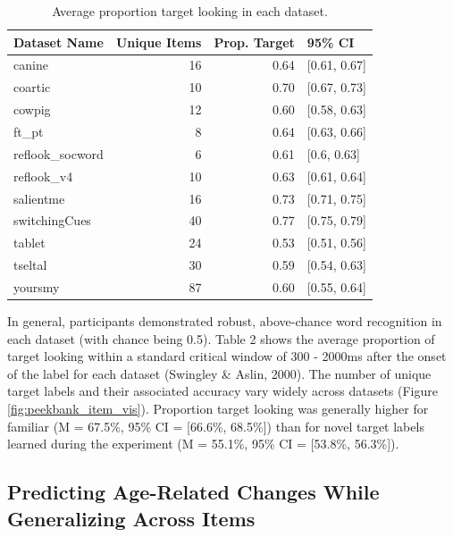 \documentclass[10pt, letterpaper]{article}
\begin{document}
\begin{table}[H]
\centering
\begingroup\fontsize{9pt}{10pt}\selectfont
\begin{tabular}{lrrl}
  \hline
Dataset Name & Unique Items & Prop. Target & 95\% CI \\ 
  \hline
canine & 16 & 0.64 & [0.61, 0.67] \\ 
  coartic & 10 & 0.70 & [0.67, 0.73] \\ 
  cowpig & 12 & 0.60 & [0.58, 0.63] \\ 
  ft\_pt & 8 & 0.64 & [0.63, 0.66] \\ 
  reflook\_socword & 6 & 0.61 & [0.6, 0.63] \\ 
  reflook\_v4 & 10 & 0.63 & [0.61, 0.64] \\ 
  salientme & 16 & 0.73 & [0.71, 0.75] \\ 
  switchingCues & 40 & 0.77 & [0.75, 0.79] \\ 
  tablet & 24 & 0.53 & [0.51, 0.56] \\ 
  tseltal & 30 & 0.59 & [0.54, 0.63] \\ 
  yoursmy & 87 & 0.60 & [0.55, 0.64] \\ 
   \hline
\end{tabular}
\endgroup
\caption{Average proportion target looking in each dataset.} 
\end{table}

In general, participants demonstrated robust, above-chance word
recognition in each dataset (with chance being 0.5). Table 2 shows the
average proportion of target looking within a standard critical window
of 300 - 2000ms after the onset of the label for each dataset (Swingley
\& Aslin, 2000). The number of unique target labels and their associated
accuracy vary widely across datasets (Figure
\ref{fig:peekbank_item_vis}). Proportion target looking was generally
higher for familiar (M = 67.5\%, 95\% CI = {[}66.6\%, 68.5\%{]}) than
for novel target labels learned during the experiment (M = 55.1\%, 95\%
CI = {[}53.8\%, 56.3\%{]}).

\hypertarget{predicting-age-related-changes-while-generalizing-across-items}{%
\subsection{Predicting Age-Related Changes While Generalizing Across
Items}\label{predicting-age-related-changes-while-generalizing-across-items}}
\end{document}
